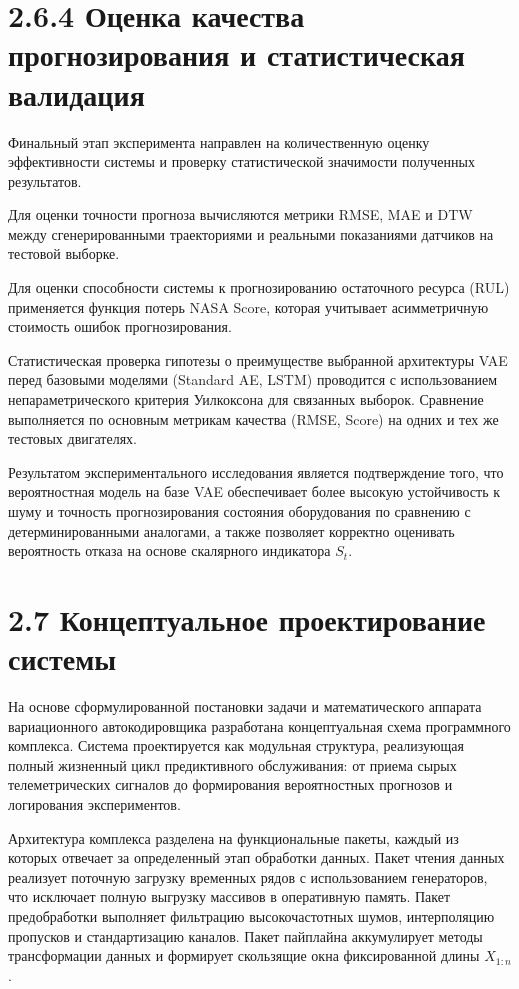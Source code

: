 \documentclass[14pt, a4paper, oneside]{extreport}
\begin{document}
\section{2.6.4 Оценка качества прогнозирования и статистическая валидация}

Финальный этап эксперимента направлен на количественную оценку эффективности системы и проверку статистической значимости полученных результатов.

Для оценки точности прогноза вычисляются метрики RMSE, MAE и DTW между сгенерированными траекториями и реальными показаниями датчиков на тестовой выборке.

Для оценки способности системы к прогнозированию остаточного ресурса (RUL) применяется функция потерь NASA Score, которая учитывает асимметричную стоимость ошибок прогнозирования.

Статистическая проверка гипотезы о преимуществе выбранной архитектуры VAE перед базовыми моделями (Standard AE, LSTM) проводится с использованием непараметрического критерия Уилкоксона для связанных выборок. Сравнение выполняется по основным метрикам качества (RMSE, Score) на одних и тех же тестовых двигателях.

Результатом экспериментального исследования является подтверждение того, что вероятностная модель на базе VAE обеспечивает более высокую устойчивость к шуму и точность прогнозирования состояния оборудования по сравнению с детерминированными аналогами, а также позволяет корректно оценивать вероятность отказа на основе скалярного индикатора $S_t$.

\vspace{1em}
\section{2.7 Концептуальное проектирование системы}
\vspace{1em}

На основе сформулированной постановки задачи и математического аппарата вариационного автокодировщика разработана концептуальная схема программного комплекса. Система проектируется как модульная структура, реализующая полный жизненный цикл предиктивного обслуживания: от приема сырых телеметрических сигналов до формирования вероятностных прогнозов и логирования экспериментов.

Архитектура комплекса разделена на функциональные пакеты, каждый из которых отвечает за определенный этап обработки данных. Пакет чтения данных реализует поточную загрузку временных рядов с использованием генераторов, что исключает полную выгрузку массивов в оперативную память. Пакет предобработки выполняет фильтрацию высокочастотных шумов, интерполяцию пропусков и стандартизацию каналов. Пакет пайплайна аккумулирует методы трансформации данных и формирует скользящие окна фиксированной длины $X_{1:n}$.
\end{document}
